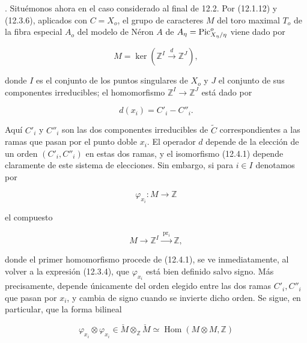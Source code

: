 

\medskip
{}. Situémonos ahora en el caso considerado al final de 12.2. Por
(12.1.12) y (12.3.6), aplicados con $C=X_o$, el grupo de caracteres $M$
del toro maximal $T_o$ de la fibra especial $A_o$ del modelo de Néron
$A$ de $\sisi{A}{A_\eta}=\underline{\operatorname{Pic}}^o_{X_\eta/\eta}$ viene dado por

\begin{equation}\tag{12.4.1}
 M=\ker\left(\mathbb Z^I\xrightarrow{\ d\ }\mathbb Z^J\right),
\end{equation}

\noindent
donde $I$ es el conjunto de los puntos singulares de $X_o$ y $J$ el
conjunto de sus componentes irreducibles; el homomorfismo
$\mathbb Z^I\to\mathbb Z^J$ está dado por

\begin{equation}\tag{12.4.2}
 d(x_i)=C'_i-C''_i.
\end{equation}

Aquí $C'_i$ y $C''_i$ son las dos componentes irreducibles de
$\widetilde C$ correspondientes a las ramas que pasan por el punto doble
$x_i$. El operador $d$ depende de la elección de un orden
$(C'_i,C''_i)$ en estas dos ramas, y el isomorfismo (12.4.1) depende
claramente de este sistema de elecciones. Sin embargo, si para $i\in I$
denotamos por

\begin{equation}\tag{12.4.3}
 \varphi_{x_i}:M\longrightarrow\mathbb Z
\end{equation}

\noindent
el compuesto

\begin{equation*}
 M\longrightarrow\mathbb Z^I
   \xrightarrow{\ \operatorname{pr}_i\ }\mathbb Z,
\end{equation*}

\noindent
donde el primer homomorfismo procede de (12.4.1), se ve inmediatamente,
al volver a la expresión (12.3.4), que $\varphi_{x_i}$ está bien definido
salvo signo. Más precisamente, depende únicamente del orden elegido
entre las dos ramas $C'_i,C''_i$ que pasan por $x_i$, y cambia de signo
cuando se invierte dicho orden. Se sigue, en particular, que la forma
bilineal

\begin{equation}\tag{12.4.4}
 \varphi_{x_i}\otimes\varphi_{x_i}
 \in \check M\otimes_{\mathbb Z}\check M
 \simeq\operatorname{Hom}(M\otimes M,\mathbb Z)
\end{equation}

